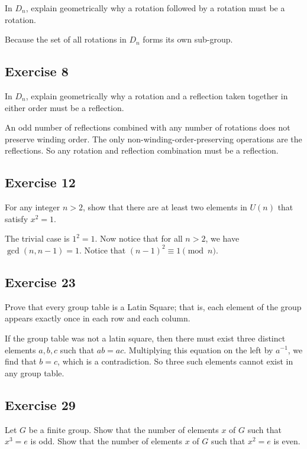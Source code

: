 \documentclass[12pt]{article}
\begin{document}
In $D_n$, explain geometrically why a rotation followed by a rotation must be a rotation.

Because the set of all rotations in $D_n$ forms its own sub-group.

\subsection*{Exercise 8}

In $D_n$, explain geometrically why a rotation and a reflection taken together in either order must be a reflection.

An odd number of reflections combined with any number of rotations does not preserve winding order.
The only non-winding-order-preserving operations are the reflections.  So any rotation and
reflection combination must be a reflection.

\subsection*{Exercise 12}

For any integer $n>2$, show that there are at least two elements in $U(n)$ that satisfy $x^2=1$.

The trivial case is $1^2=1$.  Now notice that for all $n>2$, we have $\gcd(n,n-1)=1$.
Notice that $(n-1)^2\equiv 1\pmod n$.

\subsection*{Exercise 23}

Prove that every group table is a Latin Square; that is, each element of the group appears
exactly once in each row and each column.

If the group table was not a latin square, then there must exist three distinct elements $a,b,c$
such that $ab=ac$.  Multiplying this equation on the left by $a^{-1}$, we find that $b=c$,
which is a contradiction.  So three such elements cannot exist in any group table.

\subsection*{Exercise 29}

Let $G$ be a finite group.  Show that the number of elements $x$ of $G$ such
that $x^3=e$ is odd.  Show that the number of elements $x$ of $G$ such that
$x^2=e$ is even.
\end{document}

